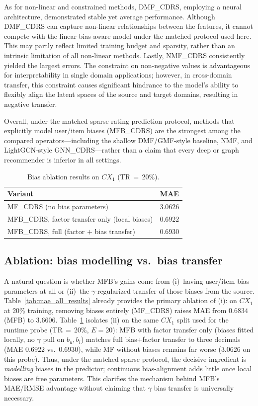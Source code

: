 \documentclass[pdflatex,sn-mathphys-num]{sn-jnl}%
\theoremstyle{thmstyleone}%
\theoremstyle{thmstyletwo}%
\theoremstyle{thmstylethree}%
\begin{document}
As for non-linear and constrained methods, DMF\_CDRS, employing a neural architecture, demonstrated stable yet average performance. Although DMF\_CDRS can capture non-linear relationships between the features, it cannot compete with the linear bias-aware model under the matched protocol used here. This may partly reflect limited training budget and sparsity, rather than an intrinsic limitation of all non-linear methods. Lastly, NMF\_CDRS consistently yielded the largest errors. The constraint on non-negative values is advantageous for interpretability in single domain applications; however, in cross-domain transfer, this constraint causes significant hindrance to the model's ability to flexibly align the latent spaces of the source and target domains, resulting in negative transfer.

Overall, under the matched sparse rating-prediction protocol, methods that explicitly model user/item biases (MFB\_CDRS) are the strongest among the compared operators---including the shallow DMF/GMF-style baseline, NMF, and LightGCN-style GNN\_CDRS---rather than a claim that every deep or graph recommender is inferior in all settings.

\begin{table}[!htbp]
\centering
\caption{Bias ablation results on $CX_1$ (TR\,$=$\,20\%).}
\label{tab:ablation}
\renewcommand{\arraystretch}{1.15}
\small
\begin{tabularx}{\textwidth}{>{\raggedright\arraybackslash}X c}
\toprule
\textbf{Variant} & \textbf{MAE} \\
\midrule
MF\_CDRS (no bias parameters) & $3.0626$ \\
MFB\_CDRS, factor transfer only (local biases) & $0.6922$ \\
MFB\_CDRS, full (factor $+$ bias transfer) & $0.6930$ \\
\bottomrule
\end{tabularx}
\end{table}

\subsection{Ablation: bias modelling vs.\ bias transfer}\label{sec:ablation}
A natural question is whether MFB's gains come from (i)~having user/item bias parameters at all or (ii)~the $\gamma$-regularized transfer of those biases from the source. Table~\ref{tab:mae_all_results} already provides the primary ablation of (i): on $CX_1$ at 20\% training, removing biases entirely (MF\_CDRS) raises MAE from $0.6834$ (MFB) to $3.6606$. Table~\ref{tab:ablation} isolates (ii) on the same $CX_1$ split used for the runtime probe (TR\,$=$\,20\%, $E=20$): MFB with factor transfer only (biases fitted locally, no $\gamma$ pull on $b_u,b_i$) matches full bias+factor transfer to three decimals (MAE $0.6922$ vs.\ $0.6930$), while MF without biases remains far worse ($3.0626$ on this probe). Thus, under the matched sparse protocol, the decisive ingredient is \emph{modelling} biases in the predictor; continuous bias-alignment adds little once local biases are free parameters. This clarifies the mechanism behind MFB's MAE/RMSE advantage without claiming that $\gamma$ bias transfer is universally necessary.
\end{document}

